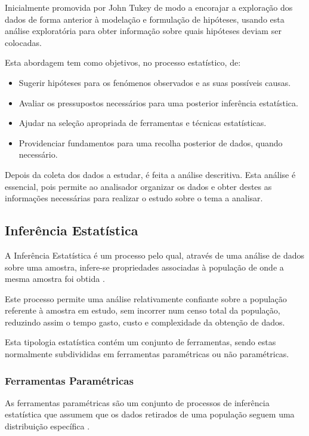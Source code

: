 \documentclass[conference]{IEEEtran}
\begin{document}
Inicialmente promovida por John Tukey de modo a encorajar a exploração dos dados de forma anterior à modelação e formulação de hipóteses, usando esta análise exploratória para obter informação sobre quais hipóteses deviam ser colocadas.

Esta abordagem tem como objetivos, no processo estatístico, de:

\begin{itemize}
    \item Sugerir hipóteses para os fenómenos observados e as suas possíveis causas.
    \item Avaliar os pressupostos necessários para uma posterior inferência estatística.
    \item Ajudar na seleção apropriada de ferramentas e técnicas estatísticas.
    \item Providenciar fundamentos para uma recolha posterior de dados, quando necessário.
\end{itemize}


Depois da coleta dos dados a estudar, é feita a análise descritiva. Esta análise é essencial, pois permite ao analisador organizar os dados e obter destes as informações necessárias para realizar o estudo sobre o tema a analisar.

\subsection{Inferência Estatística}

A Inferência Estatística é um processo pelo qual, através de uma análise de dados sobre uma amostra, infere-se propriedades associadas à população de onde a mesma amostra foi obtida \cite{Upton_Cook_2008}.

Este processo permite uma análise relativamente confiante sobre a população referente à amostra em estudo, sem incorrer num censo total da população, reduzindo assim o tempo gasto, custo e complexidade da obtenção de dados.

Esta tipologia estatística contém um conjunto de ferramentas, sendo estas normalmente subdivididas em ferramentas paramétricas ou não paramétricas. 

\subsubsection{Ferramentas Paramétricas}

As ferramentas paramétricas são um conjunto de processos de inferência estatística que assumem que os dados retirados de uma população seguem uma distribuição específica \cite{Cox_2006}.
\end{document}
